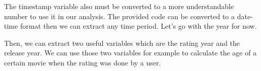 \documentclass[]{article}
\newenvironment{Shaded}{\begin{snugshade}}{\end{snugshade}}
\newcommand{\KeywordTok}[1]{\textcolor[rgb]{0.13,0.29,0.53}{\textbf{#1}}}
\newcommand{\DataTypeTok}[1]{\textcolor[rgb]{0.13,0.29,0.53}{#1}}
\newcommand{\StringTok}[1]{\textcolor[rgb]{0.31,0.60,0.02}{#1}}
\newcommand{\ControlFlowTok}[1]{\textcolor[rgb]{0.13,0.29,0.53}{\textbf{#1}}}
\newcommand{\OperatorTok}[1]{\textcolor[rgb]{0.81,0.36,0.00}{\textbf{#1}}}
\newcommand{\NormalTok}[1]{#1}
\begin{document}
The timestamp variable also must be converted to a more understandable
number to use it in our analysis. The provided code can be converted to
a date-time format then we can extract any time period. Let's go with
the year for now.

Then, we can extract two useful variables which are the rating year and
the release year. We can use those two variables for example to
calculate the age of a certain movie when the rating was done by a user.

\begin{Shaded}
\end{Shaded}
\end{document}
